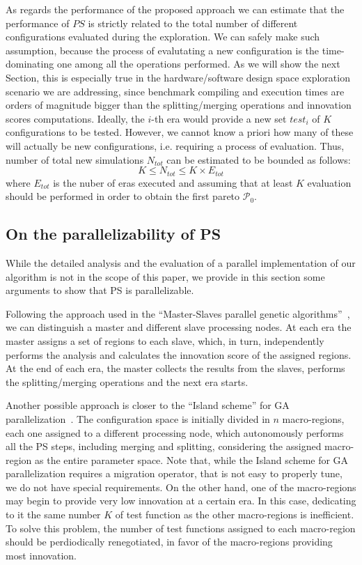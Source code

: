 As regards the performance of the proposed approach we can estimate that the
performance of $PS$ is strictly related to the total number of
different configurations evaluated during the exploration. We can
safely make such assumption, because the process of evalutating a new
configuration is the time-dominating one among all the operations
performed. As we will show the
next Section, this is especially true in the hardware/software
design space exploration scenario we are addressing, since benchmark compiling and execution times
are orders of magnitude bigger than the splitting/merging operations and
innovation scores computations.  Ideally, the $i$-th era would provide a new set
$test_i$ of $K$ configurations to be tested. However, we cannot know
a priori how many of
these will actually be new configurations, i.e. requiring a process of
evaluation. Thus, number of total new simulations $N_{tot}$ 
can be estimated to be bounded as follows:
\[
K \le N_{tot} \le K \times E_{tot}
\]
where $E_{tot}$ is the nuber of eras executed and assuming that at
least $K$ evaluation should be performed in order to obtain the first
pareto $\mathscr{P}_0$. 





\subsection{On the parallelizability of PS}
While the detailed analysis and the evaluation of a parallel implementation of our algorithm is not in the scope of this paper, we provide in this section some arguments to show that PS is parallelizable. 

Following the approach used in the ``Master-Slaves parallel genetic algorithms''~\cite{Cantu-Paz98asurvey,Borkar14parallel}, we can distinguish a master and different slave processing nodes. At each era the master assigns a set of regions to each slave, which, in turn, independently performs the analysis and calculates the innovation score of the assigned regions. At the end of each era, the master collects the results from the slaves, performs the splitting/merging operations and the next era starts.

Another possible approach is closer to the ``Island scheme'' for GA parallelization~\cite{Borkar14parallel}. The configuration space is initially divided in $n$ macro-regions, each one assigned to a different processing node, which autonomously performs all the PS steps, including merging and splitting, considering the assigned macro-region as the entire parameter space. Note that, while the Island scheme for GA parallelization requires a migration operator, that is not easy to properly tune, we do not have special requirements. On the other hand, one of the macro-regions may begin to provide very low innovation at a certain era. In this case, dedicating to it the same number $K$ of test function as the other macro-regions is inefficient. To solve this problem, the number of test functions assigned to each macro-region should be perdiodically renegotiated, in favor of the macro-regions providing most innovation.

